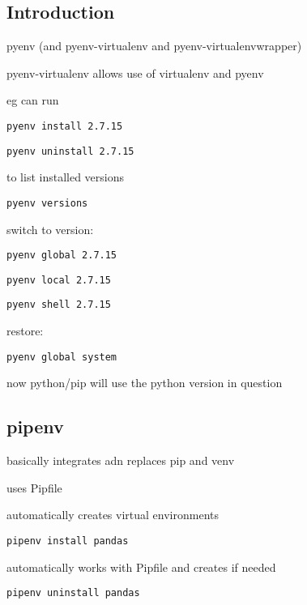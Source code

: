 
\subsection{Introduction}


pyenv (and pyenv-virtualenv and pyenv-virtualenvwrapper)

pyenv-virtualenv allows use of virtualenv and pyenv

eg can run 
\begin{verbatim}
pyenv install 2.7.15
\end{verbatim}

\begin{verbatim}
pyenv uninstall 2.7.15
\end{verbatim}

to list installed versions
\begin{verbatim}
pyenv versions
\end{verbatim}

switch to version:

\begin{verbatim}
pyenv global 2.7.15
\end{verbatim}

\begin{verbatim}
pyenv local 2.7.15
\end{verbatim}

\begin{verbatim}
pyenv shell 2.7.15
\end{verbatim}

restore:

\begin{verbatim}
pyenv global system
\end{verbatim}

now python/pip will use the python version in question


\subsection{pipenv}


basically integrates adn replaces pip and venv

uses Pipfile

automatically creates virtual environments

\begin{verbatim}
pipenv install pandas
\end{verbatim}

automatically works with Pipfile and creates if needed

\begin{verbatim}
pipenv uninstall pandas
\end{verbatim}

